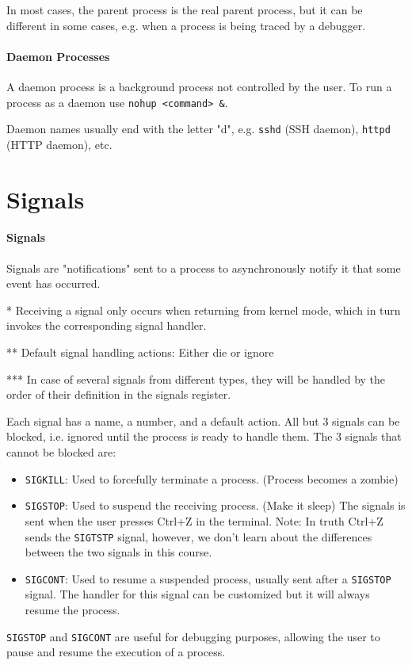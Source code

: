 \documentclass[openany,12pt]{book}
\newcommand{\code}[1]{\texttt{#1}}
\begin{document}
In most cases, the parent process is the real parent process, but it can be different in some cases, e.g. when a process is being traced by a debugger.



\paragraph{Daemon Processes}
A daemon process is a background process not controlled by the user.
To run a process as a daemon use \code{nohup <command> \&}.

Daemon names usually end with the letter "d", e.g. \texttt{sshd} (SSH daemon), \texttt{httpd} (HTTP daemon), etc.




\newpage
\section*{Signals}
\paragraph{Signals}
Signals are "notifications" sent to a process to asynchronously notify it that some event has occurred.

* Receiving a signal only occurs when returning from kernel mode, which in turn invokes the corresponding signal handler.

** Default signal handling actions: Either die or ignore

*** In case of several signals from different types, they will be handled by the order of their definition in the signals register.


\vspace{1em}

Each signal has a name, a number, and a default action. All but 3 signals can be blocked, i.e. ignored until the process is ready to handle them. The 3 signals that cannot be blocked are:
\begin{itemize}
  \item \texttt{SIGKILL}: Used to forcefully terminate a process. (Process becomes a zombie)
  \item \texttt{SIGSTOP}: Used to suspend the receiving process. (Make it sleep) The signals is sent when the user presses Ctrl+Z in the terminal. {\color{gray}Note: In truth Ctrl+Z sends the \texttt{SIGTSTP} signal, however, we don't learn about the differences between the two signals in this course.}
  \item \texttt{SIGCONT}: Used to resume a suspended process, usually sent after a \texttt{SIGSTOP} signal. The handler for this signal can be customized but it {\color{red}will always} resume the process.
\end{itemize}
\texttt{SIGSTOP} and \texttt{SIGCONT} are useful for debugging purposes, allowing the user to pause and resume the execution of a process.
\end{document}
